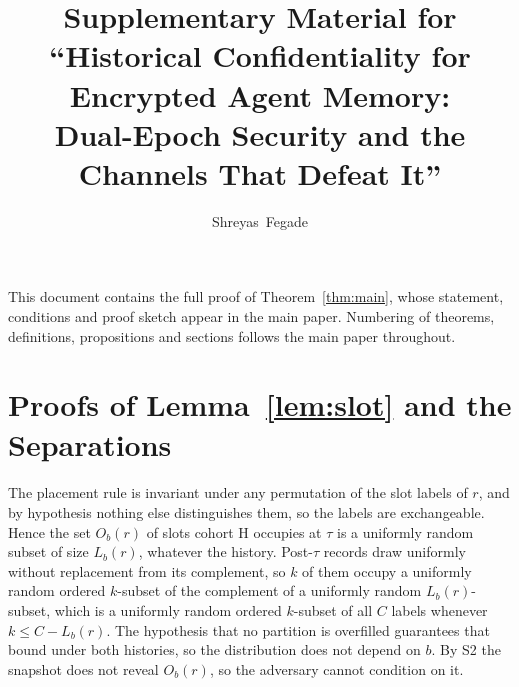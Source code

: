 \documentclass[10pt,journal,compsoc]{IEEEtran}
\begin{document}
\title{Supplementary Material for\\
``Historical Confidentiality for Encrypted Agent Memory:\\ Dual-Epoch Security and the Channels
That Defeat It''}

\author{Shreyas~Fegade%
}


\maketitle

\noindent
This document contains the full proof of Theorem~\ref{thm:main}, whose statement, conditions and
proof sketch appear in the main paper. Numbering of theorems, definitions, propositions and
sections follows the main paper throughout.



\section{Proofs of Lemma~\ref{lem:slot} and the Separations}
\label{supp:separations}

\paragraph{} The placement rule is invariant under any permutation of the slot labels
of $r$, and by hypothesis nothing else distinguishes them, so the labels are exchangeable. Hence the
set $O_b(r)$ of slots cohort H occupies at $\tau$ is a uniformly random subset of size $L_b(r)$,
whatever the history. Post-$\tau$ records draw uniformly without replacement from its complement, so
$k$ of them occupy a uniformly random ordered $k$-subset of the complement of a uniformly random
$L_b(r)$-subset, which is a uniformly random ordered $k$-subset of all $C$ labels whenever
$k \le C - L_b(r)$. The hypothesis that no partition is overfilled guarantees that bound under both
histories, so the distribution does not depend on $b$. By S2 the snapshot does not reveal $O_b(r)$,
so the adversary cannot condition on it.
\end{document}
